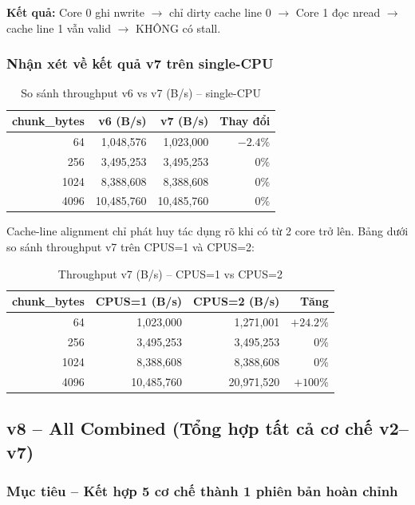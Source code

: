 \documentclass[12pt,a4paper]{article}
\begin{document}
\textbf{Kết quả:} Core 0 ghi nwrite $\to$ chỉ dirty cache line 0 $\to$ Core 1 đọc
nread $\to$ cache line 1 vẫn valid $\to$ KHÔNG có stall.

\subsubsection{Nhận xét về kết quả v7 trên single-CPU}

\begin{table}[H]
\centering
\caption{So sánh throughput v6 vs v7 (B/s) -- single-CPU}
\begin{tabular}{rrrr}
\toprule
\textbf{chunk\_bytes} & \textbf{v6 (B/s)} & \textbf{v7 (B/s)} & \textbf{Thay đổi} \\
\midrule
64   & 1,048,576  & 1,023,000  & $-2.4\%$ \\
256  & 3,495,253  & 3,495,253  & $0\%$ \\
1024 & 8,388,608  & 8,388,608  & $0\%$ \\
4096 & 10,485,760 & 10,485,760 & $0\%$ \\
\bottomrule
\end{tabular}
\end{table}

Cache-line alignment chỉ phát huy tác dụng rõ khi có từ 2 core trở lên.
Bảng dưới so sánh throughput v7 trên CPUS=1 và CPUS=2:

\begin{table}[H]
\centering
\caption{Throughput v7 (B/s) -- CPUS=1 vs CPUS=2}
\begin{tabular}{rrrr}
\toprule
\textbf{chunk\_bytes} & \textbf{CPUS=1 (B/s)} & \textbf{CPUS=2 (B/s)} & \textbf{Tăng} \\
\midrule
64   & 1,023,000  & 1,271,001  & $+24.2\%$ \\
256  & 3,495,253  & 3,495,253  & $0\%$ \\
1024 & 8,388,608  & 8,388,608  & $0\%$ \\
4096 & 10,485,760 & 20,971,520 & $+100\%$ \\
\bottomrule
\end{tabular}
\end{table}


\subsection{v8 -- All Combined (Tổng hợp tất cả cơ chế v2--v7)}

\subsubsection{Mục tiêu -- Kết hợp 5 cơ chế thành 1 phiên bản hoàn chỉnh}
\end{document}
